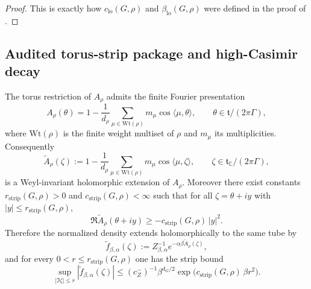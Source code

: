 \begin{proof}
This is exactly how $c_{\mathrm{lo}}(G,\rho)$ and $\beta_{\mathrm{lo}}(G,\rho)$ were defined in the proof of .
\end{proof}

\subsection{Audited torus-strip package and high-Casimir decay}

\begin{lemma}\label{lem:A1_torus_strip_extension}
The torus restriction of $A_\rho$ admits the finite Fourier presentation
\begin{equation}\label{eq:A1_weight_expansion_action}
A_\rho(\theta)
=
1-\frac{1}{d_\rho}\sum_{\mu\in \mathrm{Wt}(\rho)} m_\mu\cos\langle \mu,\theta\rangle,
\qquad \theta\in \mathfrak t/(2\pi\Gamma),
\end{equation}
where $\mathrm{Wt}(\rho)$ is the finite weight multiset of $\rho$ and $m_\mu$ its multiplicities.
Consequently
\begin{equation}\label{eq:A1_holomorphic_action_extension}
\widetilde A_\rho(\zeta)
:=
1-\frac{1}{d_\rho}\sum_{\mu\in \mathrm{Wt}(\rho)} m_\mu\cos\langle \mu,\zeta\rangle,
\qquad \zeta\in \mathfrak t_\mathbb C/(2\pi\Gamma),
\end{equation}
is a Weyl-invariant holomorphic extension of $A_\rho$.
Moreover there exist constants $r_{\mathrm{strip}}(G,\rho)>0$ and $c_{\mathrm{strip}}(G,\rho)<\infty$ such that for all $\zeta=\theta+iy$ with $|y|\le r_{\mathrm{strip}}(G,\rho)$,
\begin{equation}\label{eq:A1_strip_quadratic_loss}
\Re\widetilde A_\rho(\theta+iy)
\ge
-c_{\mathrm{strip}}(G,\rho)\,|y|^2.
\end{equation}
Therefore the normalized density extends holomorphically to the same tube by
\[
\widetilde f_{\beta,\alpha}(\zeta)
:=
Z_{\beta,\alpha}^{-1}e^{-\alpha\beta \widetilde A_\rho(\zeta)},
\]
and for every $0<r\le r_{\mathrm{strip}}(G,\rho)$ one has the strip bound
\begin{equation}\label{eq:A1_strip_sup_bound}
\sup_{|\Im\zeta|\le r}
|\widetilde f_{\beta,\alpha}(\zeta)|
\le
(c_Z^-)^{-1}\beta^{d_G/2}
\exp\!\bigl(c_{\mathrm{strip}}(G,\rho)\,\beta r^2\bigr).
\end{equation}
\end{lemma}


